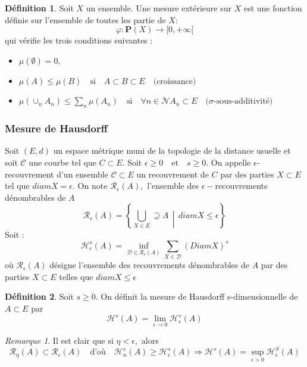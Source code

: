 \documentclass[12pt,a4paper]{article}
\theoremstyle{plain}
\theoremstyle{plain}
\theoremstyle{definition}
\newtheorem{definition}{Définition}
\theoremstyle{remark}
\newtheorem*{rmq}{Remarque}
\newcommand{\enstq}[2]{\left\{#1\,\middle|\,#2\right\}}
\newcommand{\N}[1]{\mathcal{N}}
\newcommand{\textm}[1]{\quad \text{#1} \quad}
\begin{document}
\begin{definition}
Soit $X$ un ensemble. Une mesure extérieure sur $X$ est une fonction définie sur l'ensemble de toutes les partie de $X$:
\[\varphi : \mathbf{P}(X) \longrightarrow [0, +\infty[\]
qui vérifie les trois conditions suivantes :
\begin{itemize}
\item $\mu (\emptyset) = 0,$
\item $\mu(A)\leq \mu (B) \textm{si} A\subset B \subset E \textm{(croissance)}$
\item $\mu (\cup_n A_n) \leq \sum_n \mu (A_n) \textm{si} \forall n \in \N, A_n \subset E \textm{($\sigma$-sous-additivité)}$
\end{itemize}
\end{definition}

	\subsubsection{Mesure de Hausdorff}
Soit $(E,d)$ un espace métrique muni de la topologie de la distance usuelle et soit $\mathcal{C}$ une courbe tel que $C \subset E.$ Soit $\epsilon \geq 0 \textm{et} s \geq 0.$ On appelle $\epsilon$-recouvrement d'un ensemble $\mathcal{C} \subset E$ un recouvrement de $C$ par des parties $X \subset E$ tel que $diam X = \epsilon.$ On note $\mathcal{R}_\epsilon(A),$ l'ensemble des $\epsilon-$recouvrements dénombrables de $A$
\[\mathcal{R}_\epsilon (A)= \enstq{\bigcup_{X \in E}\supseteq A}{diam X \leq \epsilon}\]
Soit :
\[\mathcal{H}_\epsilon^s (A) = \inf_{\mathcal{D}\in \mathcal{R}_\epsilon(A)}\sum_{X \in \mathcal{D}}(Diam X)^s\]
où $\mathcal{R}_\epsilon (A)$ désigne l'ensemble des recouvrements dénombrables de $A$ par des parties $X \subset E$ telles que $diam X \leq \epsilon$

\begin{definition}
Soit $s \geq 0.$ On définit la mesure de Hausdorff s-dimensionnelle de $A \subset E$ par
\[\mathcal{H}^s(A) = \lim\limits_{\epsilon \rightarrow 0} \mathcal{H}_\epsilon^s(A)\]
\end{definition}
\begin{rmq}
Il est clair que si $\eta < \epsilon,$ alors \[\mathcal{R}_\eta (A) \subset \mathcal{R}_\epsilon(A) \textm{d'où} 
\mathcal{H}_n^s(A)\geq\mathcal{H}_\epsilon^s(A) \Rightarrow \mathcal{H}^s(A) = \sup_{\epsilon > 0}\mathcal{H}_\epsilon^S(A)\]
\end{rmq}
\end{document}
